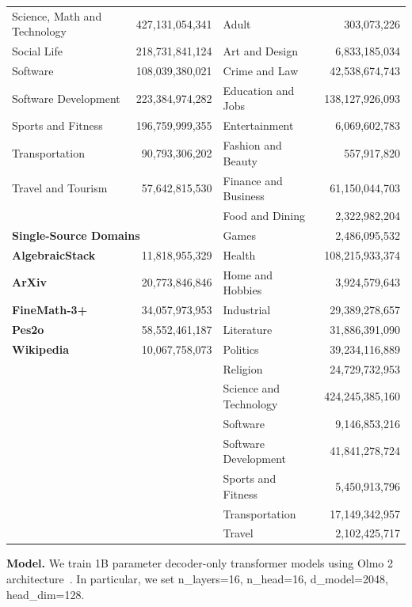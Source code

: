 \documentclass[table]{ai2style/ai2}
\begin{document}
\begin{table}[h]
\begin{tabular}{l r | l r}
\quad Science, Math and Technology & 427,131,054,341 & \quad Adult & 303,073,226 \\
\quad Social Life & 218,731,841,124 & \quad Art and Design & 6,833,185,034 \\
\quad Software & 108,039,380,021 & \quad Crime and Law & 42,538,674,743 \\
\quad Software Development & 223,384,974,282 & \quad Education and Jobs & 138,127,926,093 \\
\quad Sports and Fitness & 196,759,999,355 & \quad Entertainment & 6,069,602,783 \\
\quad Transportation & 90,793,306,202 & \quad Fashion and Beauty & 557,917,820 \\
\quad Travel and Tourism & 57,642,815,530 & \quad Finance and Business & 61,150,044,703 \\
 & & \quad Food and Dining & 2,322,982,204 \\
\multicolumn{2}{l|}{\textbf{Single-Source Domains}} & \quad Games & 2,486,095,532 \\
\textbf{AlgebraicStack}~\citep{azerbayev2023llemma} & 11,818,955,329 & \quad Health & 108,215,933,374 \\
\textbf{ArXiv}~\citep{azerbayev2023llemma} & 20,773,846,846 & \quad Home and Hobbies & 3,924,579,643 \\
\textbf{FineMath-3+}~\citep{allal2025smollm2smolgoesbig} & 34,057,973,953 & \quad Industrial & 29,389,278,657 \\
\textbf{Pes2o}~\citep{peS2o} & 58,552,461,187 & \quad Literature & 31,886,391,090 \\
\textbf{Wikipedia}~\citep{soldaini2024dolma} & 10,067,758,073 & \quad Politics & 39,234,116,889 \\
 & & \quad Religion & 24,729,732,953 \\
 & & \quad Science and Technology & 424,245,385,160 \\
 & & \quad Software & 9,146,853,216 \\
 & & \quad Software Development & 41,841,278,724 \\
 & & \quad Sports and Fitness & 5,450,913,796 \\
 & & \quad Transportation & 17,149,342,957 \\
 & & \quad Travel & 2,102,425,717 \\
\bottomrule
\end{tabular}
\label{tab:domain_sizes}
\end{table}

\textbf{Model.} We train 1B parameter decoder-only transformer models using Olmo 2 architecture~\citep{olmo20242olmo2furious}. In particular, we set n\_layers=16, n\_head=16, d\_model=2048, head\_dim=128.
\end{document}
